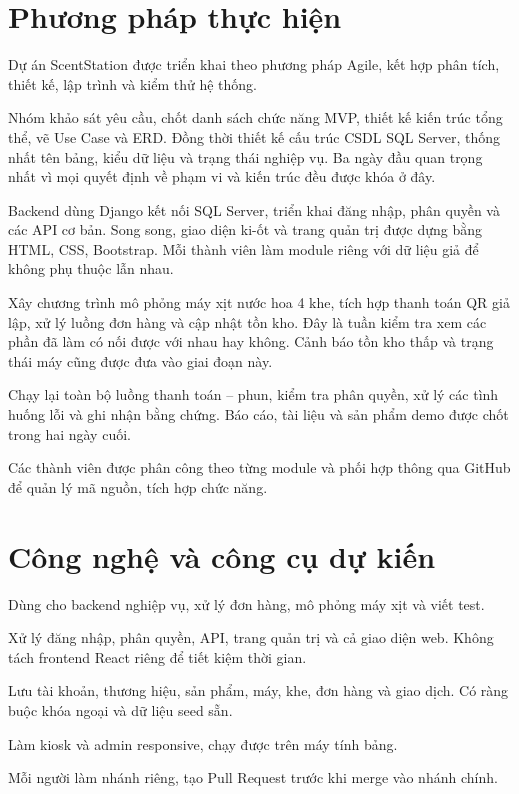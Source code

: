 \section{Phương pháp thực hiện}

Dự án ScentStation được triển khai theo phương pháp Agile, kết hợp phân tích, thiết kế, lập trình và kiểm thử hệ thống.

Nhóm khảo sát yêu cầu, chốt danh sách chức năng MVP, thiết kế kiến trúc tổng thể, vẽ Use Case và ERD. Đồng thời thiết kế cấu trúc CSDL SQL Server, thống nhất tên bảng, kiểu dữ liệu và trạng thái nghiệp vụ. Ba ngày đầu quan trọng nhất vì mọi quyết định về phạm vi và kiến trúc đều được khóa ở đây.

Backend dùng Django kết nối SQL Server, triển khai đăng nhập, phân quyền và các API cơ bản. Song song, giao diện ki-ốt và trang quản trị được dựng bằng HTML, CSS, Bootstrap. Mỗi thành viên làm module riêng với dữ liệu giả để không phụ thuộc lẫn nhau.

Xây chương trình mô phỏng máy xịt nước hoa 4 khe, tích hợp thanh toán QR giả lập, xử lý luồng đơn hàng và cập nhật tồn kho. Đây là tuần kiểm tra xem các phần đã làm có nối được với nhau hay không. Cảnh báo tồn kho thấp và trạng thái máy cũng được đưa vào giai đoạn này.

Chạy lại toàn bộ luồng thanh toán -- phun, kiểm tra phân quyền, xử lý các tình huống lỗi và ghi nhận bằng chứng. Báo cáo, tài liệu và sản phẩm demo được chốt trong hai ngày cuối.

Các thành viên được phân công theo từng module và phối hợp thông qua GitHub để quản lý mã nguồn, tích hợp chức năng.

\section{Công nghệ và công cụ dự kiến}

\begin{description}[style=nextline, leftmargin=1cm]
  \item[Ngôn ngữ chính: Python.] Dùng cho backend nghiệp vụ, xử lý đơn hàng, mô phỏng máy xịt và viết test.
  \item[Framework: Django.] Xử lý đăng nhập, phân quyền, API, trang quản trị và cả giao diện web. Không tách frontend React riêng để tiết kiệm thời gian.
  \item[Cơ sở dữ liệu: SQL Server.] Lưu tài khoản, thương hiệu, sản phẩm, máy, khe, đơn hàng và giao dịch. Có ràng buộc khóa ngoại và dữ liệu seed sẵn.
  \item[Giao diện: HTML + CSS + Bootstrap.] Làm kiosk và admin responsive, chạy được trên máy tính bảng.
  \item[Quản lý mã nguồn: Git + GitHub.] Mỗi người làm nhánh riêng, tạo Pull Request trước khi merge vào nhánh chính.
\end{description}

